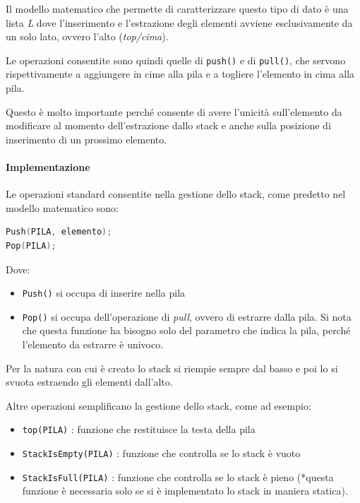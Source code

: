 \documentclass[
  paper=a4,
  oneside  ,captions=tableheading
]{scrbook}
\newcommand{\passthrough}[1]{#1}
\providecommand{\tightlist}{%
  \setlength{\itemsep}{0pt}\setlength{\parskip}{0pt}}
\begin{document}
Il modello matematico che permette di caratterizzare questo tipo di dato
è una lista \emph{L} dove l'inserimento e l'estrazione degli elementi
avviene esclusivamente da un solo lato, ovvero l'alto (\emph{top/cima}).

Le operazioni consentite sono quindi quelle di
\passthrough{\lstinline!push()!} e di \passthrough{\lstinline!pull()!},
che servono rispettivamente a aggiungere in cime alla pila e a togliere
l'elemento in cima alla pila.

Questo è molto importante perché consente di avere l'unicità
sull'elemento da modificare al momento dell'estrazione dallo stack e
anche sulla posizione di inserimento di un prossimo elemento.

\hypertarget{implementazione-1}{%
\paragraph{Implementazione}\label{implementazione-1}}

Le operazioni standard consentite nella gestione dello stack, come
predetto nel modello matematico sono:

\begin{lstlisting}[language=C]
Push(PILA, elemento);
Pop(PILA); 
\end{lstlisting}

Dove:

\begin{itemize}
\tightlist
\item
  \passthrough{\lstinline!Push()!} si occupa di inserire nella pila
\item
  \passthrough{\lstinline!Pop()!} si occupa dell'operazione di
  \emph{pull}, ovvero di estrarre dalla pila. Si nota che questa
  funzione ha bisogno solo del parametro che indica la pila, perché
  l'elemento da estrarre è univoco.
\end{itemize}

Per la natura con cui è creato lo stack si riempie sempre dal basso e
poi lo si svuota estraendo gli elementi dall'alto.

Altre operazioni semplificano la gestione dello stack, come ad esempio:

\begin{itemize}
\tightlist
\item
  \passthrough{\lstinline!top(PILA)!} : funzione che restituisce la
  testa della pila
\item
  \passthrough{\lstinline!StackIsEmpty(PILA)!} : funzione che controlla
  se lo stack è vuoto
\item
  \passthrough{\lstinline!StackIsFull(PILA)!} : funzione che controlla
  se lo stack è pieno (*questa funzione è necessaria solo se si è
  implementato lo stack in maniera statica).
\end{itemize}
\end{document}
